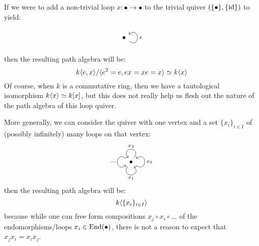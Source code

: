             \begin{example} \label{example: path_algebras_of_loop_quivers}
                If we were to add a non-trivial loop $x: \bullet \to \bullet$ to the trivial quiver $(\{\bullet\}, \{\mathrm{id}\})$ to yield:
                    $$
                        \begin{tikzcd}
                            \bullet \arrow["x"', loop, distance=2em, in=35, out=325]
                        \end{tikzcd}
                    $$
                then the resulting path algebra will be:
                    $$k\langle e, x\rangle/\langle e^2 = e, ex = xe = x\rangle \simeq k\langle x\rangle$$
                Of course, when $k$ is a commutative ring, then we have a tautological isomorphism $k\langle x\rangle \simeq k[x]$, but this does not really help us flesh out the nature of the path algebra of this loop quiver.
                    
                More generally, we can consider the quiver with one vertex and a set $\{x_i\}_{i \in I}$ of (possibly infinitely) many loops on that vertex:
                    $$
                        \begin{tikzcd}
                            \bullet \arrow["x_1"', loop, distance=2em, in=305, out=235] \arrow["x_2"', loop, distance=2em, in=35, out=325] \arrow["x_3"', loop, distance=2em, in=125, out=55] \arrow["\cdots"', loop, distance=2em, in=215, out=145]
                        \end{tikzcd}
                    $$
                then the resulting path algebra will be:
                    $$k\langle\{x_i\}_{i \in I}\rangle$$
                because while one can free form compositions $x_j \circ x_i \circ ...$ of the endomorphisms/loops $x_i \in \mathrm{End}(\bullet)$, there is not a reason to expect that $x_j x_i = x_i x_j$. 
            \end{example}
